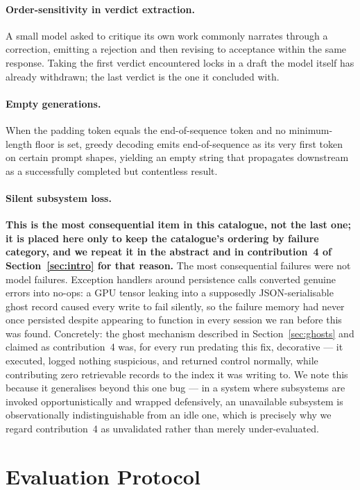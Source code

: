 \documentclass[11pt]{article}
\begin{document}
\paragraph{Order-sensitivity in verdict extraction.} A small model asked to
critique its own work commonly narrates through a correction, emitting a
rejection and then revising to acceptance within the same response. Taking the
first verdict encountered locks in a draft the model itself has already
withdrawn; the last verdict is the one it concluded with.

\paragraph{Empty generations.} When the padding token equals the
end-of-sequence token and no minimum-length floor is set, greedy decoding emits
end-of-sequence as its very first token on certain prompt shapes, yielding an
empty string that propagates downstream as a successfully completed but
contentless result.

\paragraph{Silent subsystem loss.} \textbf{This is the most consequential item
in this catalogue, not the last one; it is placed here only to keep the
catalogue's ordering by failure category, and we repeat it in the abstract and
in contribution~4 of Section~\ref{sec:intro} for that reason.} The most
consequential failures were not model failures. Exception handlers around
persistence calls converted genuine errors into no-ops: a GPU tensor leaking
into a supposedly JSON-serialisable ghost record caused every write to fail
silently, so the failure memory had never once persisted despite appearing to
function in every session we ran before this was found. Concretely: the ghost
mechanism described in Section~\ref{sec:ghosts} and claimed as contribution~4
was, for every run predating this fix, decorative --- it executed, logged
nothing suspicious, and returned control normally, while contributing zero
retrievable records to the index it was writing to. We note this because it
generalises beyond this one bug --- in a system where subsystems are invoked
opportunistically and wrapped defensively, an unavailable subsystem is
observationally indistinguishable from an idle one, which is precisely why we
regard contribution~4 as unvalidated rather than merely under-evaluated.

\section{Evaluation Protocol}
\label{sec:eval}
\end{document}
